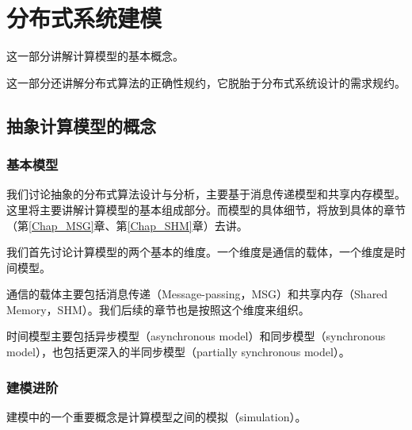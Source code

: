 \documentclass[UTF8]{ctexrep}
\begin{document}
\part{分布式系统建模}

这一部分讲解计算模型的基本概念。

这一部分还讲解分布式算法的正确性规约，它脱胎于分布式系统设计的需求规约。

\chapter{抽象计算模型的概念}

\section{基本模型}

我们讨论抽象的分布式算法设计与分析，主要基于消息传递模型和共享内存模型。
这里将主要讲解计算模型的基本组成部分。而模型的具体细节，将放到具体的章节（第\ref{Chap_MSG}章、第\ref{Chap_SHM}章）去讲。

我们首先讨论计算模型的两个基本的维度。一个维度是通信的载体，一个维度是时间模型。

通信的载体主要包括消息传递（Message-passing，MSG）和共享内存（Shared Memory，SHM）。我们后续的章节也是按照这个维度来组织。

时间模型主要包括异步模型（asynchronous model）和同步模型（synchronous model），也包括更深入的半同步模型（partially synchronous model）。



\section{建模进阶}

建模中的一个重要概念是计算模型之间的模拟（simulation）。

\end{document}

